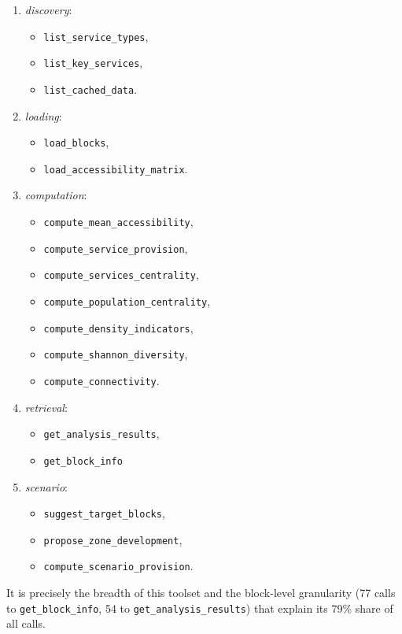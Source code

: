 \begin{enumerate}
    \item \emph{discovery}:
    \begin{itemize}
        \item \texttt{list\_service\_types},
        \item \texttt{list\_key\_services},
        \item \texttt{list\_cached\_data}.
    \end{itemize}
    \item \emph{loading}:
    \begin{itemize}
        \item \texttt{load\_blocks},
        \item \texttt{load\_accessibility\_matrix}.
    \end{itemize}
    \item \emph{computation}:
    \begin{itemize}
        \item \texttt{compute\_mean\_accessibility},
        \item \texttt{compute\_service\_provision},
        \item \texttt{compute\_services\_centrality},
        \item \texttt{compute\_population\_centrality},
        \item \texttt{compute\_density\_indicators},
        \item \texttt{compute\_shannon\_diversity},
        \item \texttt{compute\_connectivity}.
    \end{itemize}
    \item \emph{retrieval}:
    \begin{itemize}
        \item \texttt{get\_analysis\_results},
        \item \texttt{get\_block\_info}
    \end{itemize}
    \item \emph{scenario}:
    \begin{itemize}
        \item \texttt{suggest\_target\_blocks},
        \item \texttt{propose\_zone\_development},
        \item \texttt{compute\_scenario\_provision}.
    \end{itemize}
\end{enumerate}

It is precisely the breadth of this toolset and the block-level granularity (77 calls to \texttt{get\_block\_info}, 54 to \texttt{get\_analysis\_results}) that explain its 79\% share of all calls.

